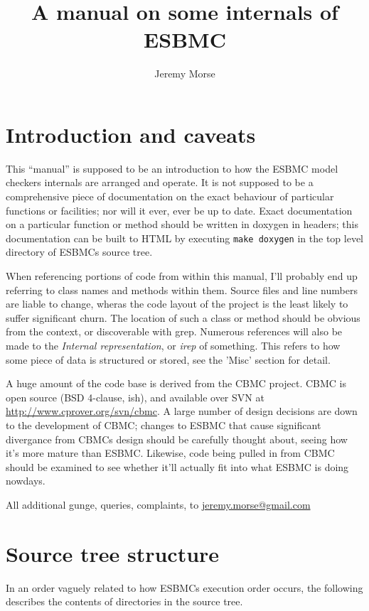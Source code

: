 \documentclass{article}
\begin{document}
\author{Jeremy Morse}
\title{A manual on some internals of ESBMC}
\maketitle
\section{Introduction and caveats}

This ``manual'' is supposed to be an introduction to how the ESBMC model
checkers internals are arranged and operate. It is not supposed to be a
comprehensive piece of documentation on the exact behaviour of particular
functions or facilities; nor will it ever, ever be up to date. Exact
documentation on a particular function or method should be written in
doxygen in headers; this documentation can be built to HTML by executing
\texttt{make doxygen} in the top level directory of ESBMCs source tree.

When referencing portions of code from within this manual, I'll probably
end up referring to class names and methods within them. Source files and
line numbers are liable to change, wheras the code layout of the project
is the least likely to suffer significant churn. The location of such a
class or method should be obvious from the context, or discoverable with
grep. Numerous references will also be made to the \textit{Internal
representation}, or \textit{irep} of something. This refers to how some piece
of data is structured or stored, see the 'Misc' section for detail.

A huge amount of the code base is derived from the CBMC project. CBMC is
open source (BSD 4-clause, ish), and available over SVN at
\url{http://www.cprover.org/svn/cbmc}. A large number of design decisions
are down to the development of CBMC; changes to ESBMC that cause
significant divergance from CBMCs design should be carefully thought
about, seeing how it's more mature than ESBMC. Likewise, code being
pulled in from CBMC should be examined to see whether it'll actually fit
into what ESBMC is doing nowdays.

All additional gunge, queries, complaints, to \url{jeremy.morse@gmail.com}

\section{Source tree structure}

In an order vaguely related to how ESBMCs execution order occurs, the
following describes the contents of directories in the source tree.
\end{document}
